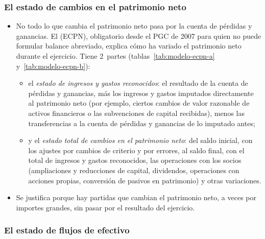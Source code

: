 \documentclass[11pt]{article}
\begin{document}
\begin{infografia}[H]
\centering
\caption{La cascada del resultado y a quién retribuye cada escalón}\label{figu:cascada-resultados}
\end{infografia}

\subsubsection{El estado de cambios en el patrimonio neto}\label{sec:ecpn}

\begin{itemize}
\item No todo lo que cambia el patrimonio neto pasa por la cuenta de pérdidas y ganancias. El  (ECPN), obligatorio desde el PGC de 2007 para quien no puede formular balance abreviado, explica cómo ha variado el patrimonio neto durante el ejercicio. Tiene 2~partes (tablas~\ref{tab:modelo-ecpn-a} y~\ref{tab:modelo-ecpn-b}):
  \begin{itemize}
  \item el \emph{estado de ingresos y gastos reconocidos}: el resultado de la cuenta de pérdidas y ganancias, más los ingresos y gastos imputados directamente al patrimonio neto (por ejemplo, ciertos cambios de valor razonable de activos financieros o las subvenciones de capital recibidas), menos las transferencias a la cuenta de pérdidas y ganancias de lo imputado antes;
  \item y el \emph{estado total de cambios en el patrimonio neto}: del saldo inicial, con los ajustes por cambios de criterio y por errores, al saldo final, con el total de ingresos y gastos reconocidos, las operaciones con los socios (ampliaciones y reducciones de capital, dividendos, operaciones con acciones propias, conversión de pasivos en patrimonio) y otras variaciones.
  \end{itemize}
\item Se justifica porque hay partidas que cambian el patrimonio neto, a veces por importes grandes, sin pasar por el resultado del ejercicio.
\end{itemize}

\subsubsection{El estado de flujos de efectivo}\label{sec:efe}
\end{document}
